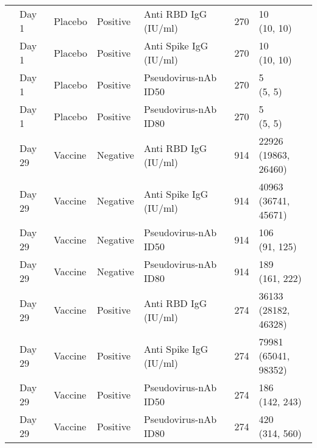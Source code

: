 \documentclass[]{book}
\theoremstyle{definition}
\theoremstyle{definition}
\theoremstyle{definition}
\newcommand{\1}{\mathbbm{1}}
\begin{document}
\begin{landscape}
\begin{ThreePartTable}
\begin{longtable}[t]{>{\raggedright\arraybackslash}p{7cm}llllll}
\hspace{1em} & Day 1 & Placebo & Positive & Anti RBD IgG (IU/ml) & 270 & \makecell[l]{10\\(10, 10)}\\
\hspace{1em} & Day 1 & Placebo & Positive & Anti Spike IgG (IU/ml) & 270 & \makecell[l]{10\\(10, 10)}\\
\hspace{1em} & Day 1 & Placebo & Positive & Pseudovirus-nAb ID50 & 270 & \makecell[l]{5\\(5, 5)}\\
\hspace{1em} & Day 1 & Placebo & Positive & Pseudovirus-nAb ID80 & 270 & \makecell[l]{5\\(5, 5)}\\
\hspace{1em} & Day 29 & Vaccine & Negative & Anti RBD IgG (IU/ml) & 914 & \makecell[l]{22926\\(19863, 26460)}\\
\hspace{1em} & Day 29 & Vaccine & Negative & Anti Spike IgG (IU/ml) & 914 & \makecell[l]{40963\\(36741, 45671)}\\
\hspace{1em} & Day 29 & Vaccine & Negative & Pseudovirus-nAb ID50 & 914 & \makecell[l]{106\\(91, 125)}\\
\hspace{1em} & Day 29 & Vaccine & Negative & Pseudovirus-nAb ID80 & 914 & \makecell[l]{189\\(161, 222)}\\
\hspace{1em} & Day 29 & Vaccine & Positive & Anti RBD IgG (IU/ml) & 274 & \makecell[l]{36133\\(28182, 46328)}\\
\hspace{1em} & Day 29 & Vaccine & Positive & Anti Spike IgG (IU/ml) & 274 & \makecell[l]{79981\\(65041, 98352)}\\
\hspace{1em} & Day 29 & Vaccine & Positive & Pseudovirus-nAb ID50 & 274 & \makecell[l]{186\\(142, 243)}\\
\hspace{1em} & Day 29 & Vaccine & Positive & Pseudovirus-nAb ID80 & 274 & \makecell[l]{420\\(314, 560)}\\

\end{longtable}
\end{ThreePartTable}
\end{landscape}
\end{document}
